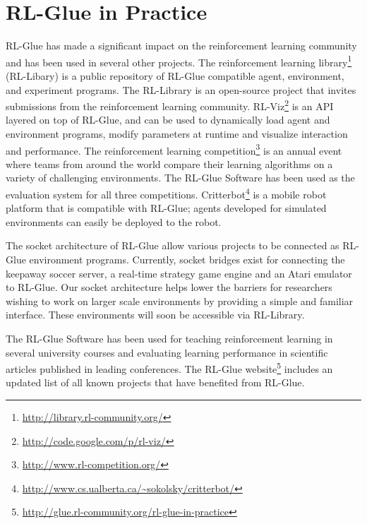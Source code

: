 \documentclass[twoside,11pt]{article}
\begin{document}
\section{RL-Glue in Practice}
RL-Glue has made a significant impact on the reinforcement learning community and has been used in several other projects. The reinforcement learning library\footnote{\url{http://library.rl-community.org/}} (RL-Libary) is a public repository of RL-Glue compatible agent, environment, and experiment programs.  The RL-Library is an open-source project that invites submissions from the reinforcement learning community.
 RL-Viz\footnote{\url{http://code.google.com/p/rl-viz/}} is an API layered on top of  RL-Glue, and can be used to dynamically load agent and environment programs, modify parameters at runtime and visualize interaction and performance.  The reinforcement learning competition\footnote{\url{http://www.rl-competition.org/}} is an annual event where teams from around the world compare their learning algorithms on a variety of challenging environments. The RL-Glue Software has been used as the evaluation system for all three competitions. Critterbot\footnote{\url{http://www.cs.ualberta.ca/~sokolsky/critterbot/}} is a mobile robot platform that is compatible with RL-Glue; agents developed for simulated environments can easily be deployed to the robot.

The socket architecture of RL-Glue allow various projects to be connected as RL-Glue environment programs. Currently, socket bridges exist for connecting the keepaway soccer server, a real-time strategy game engine and an Atari emulator to RL-Glue. Our socket architecture helps lower the barriers for researchers wishing to work on larger scale environments by providing a simple and familiar interface. These environments will soon be accessible via RL-Library. 

The RL-Glue Software has been used for teaching reinforcement learning in several university courses and evaluating learning performance in scientific articles published in leading conferences. The RL-Glue website\footnote{\url{http://glue.rl-community.org/rl-glue-in-practice}} includes an updated list of all known projects that have benefited from RL-Glue.
\end{document}
